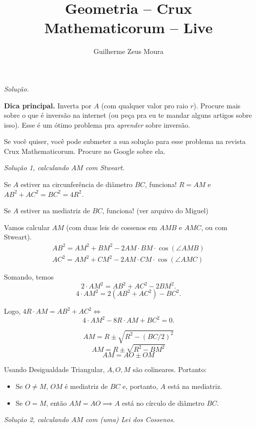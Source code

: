 \documentclass[10pt, a4paper]{article}
\title{Geometria -- Crux Mathematicorum -- Live}
\author{Guilherme Zeus Moura}
\begin{document}
	
	\zeustitle


	\noindent\textit{Solução.}

	\noindent\textbf{Dica principal.} Inverta por $A$ (com qualquer valor pro raio $r$). Procure mais sobre o que é inversão na internet (ou peça pra eu te mandar alguns artigos sobre isso). Esse é um ótimo problema pra \textit{aprender} sobre inversão.

	\begin{rem}
		Se você quiser, você pode submeter a sua solução para esse problema na revista Crux Mathematicorum. Procure no Google sobre ela.
	\end{rem}

	\newpage

	\noindent\textit{Solução 1, calculando $AM$ com Stweart.}

	Se $A$ estiver na circunferência de diâmetro $BC$, funciona! $R = AM$ e $AB^2 + AC^2 = BC^2 = 4 R^2$.

	Se $A$ estiver na mediatriz de $BC$, funciona! (ver arquivo do Miguel)
	
	Vamos calcular $AM$ (com duas leis de cossenos em $AMB$ e $AMC$, ou com Stweart).
	\begin{align*}
	AB^2 = AM^2 + BM^2 - 2 AM \cdot BM \cdot \cos(\angle AMB)\\
	AC^2 = AM^2 + CM^2 - 2 AM \cdot CM \cdot \cos(\angle AMC)
	\end{align*}

	Somando, temos \[2 \cdot AM^2 = AB^2 + AC^2 - 2 BM^2.\]
	\[4 \cdot AM^2 = 2(AB^2 + AC^2) - BC^2.\]

	Logo, $4R \cdot AM = AB^2 + AC^2 \iff$
	\[4 \cdot AM^2 - 8R \cdot AM + BC^2 = 0.\]

	\[ AM = R \pm \sqrt{R^2 - (BC/2)^2}\]	
	\[ AM = R \pm \sqrt{R^2 - BM^2}\]
	\[ AM = AO \pm OM\]

	Usando Desigualdade Triangular, $A, O, M$ são colineares. Portanto:

	\begin{itemize}
		\item Se $O \neq M$, $OM$ é mediatriz de $BC$ e, portanto, $A$ está na mediatriz.
		\item Se $O = M$, então $AM = AO \implies A$ está no círculo de diâmetro $BC$. 
	\end{itemize}

	\noindent\textit{Solução 2, calculando $AM$ com (uma) Lei dos Cossenos.}
\end{document}
